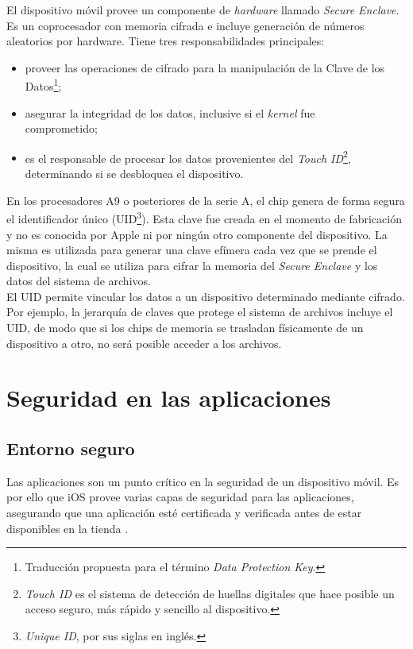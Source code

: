 El dispositivo móvil provee un componente de \textit{hardware} llamado \textit{Secure Enclave}. Es un coprocesador con memoria cifrada e incluye generación de números aleatorios por hardware. Tiene tres responsabilidades principales:
\begin{itemize}
    \item proveer las operaciones de cifrado para la manipulación de la Clave de los Datos\footnote{Traducción propuesta para el término \textit{Data Protection Key}.};
    \item asegurar la integridad de los datos, inclusive si el \textit{kernel} fue \\comprometido;
    \item es el responsable de procesar los datos provenientes del \textit{Touch ID}\footnote{\textit{Touch ID} es el sistema de detección de huellas digitales que hace posible un acceso seguro, más rápido y sencillo al dispositivo.}, determinando si se desbloquea el dispositivo.
\end{itemize}
En los procesadores A9 o posteriores de la serie A, el chip genera de forma segura el identificador único (UID\footnote{\textit{Unique ID}, por sus siglas en inglés.}). Esta clave fue creada en el momento de fabricación y no es conocida por Apple ni por ningún otro componente del dispositivo. La misma es utilizada para generar una clave efímera cada vez que se prende el dispositivo, la cual se utiliza para cifrar la memoria del \textit{Secure Enclave} y los datos del sistema de archivos.\\

El UID permite vincular los datos a un dispositivo determinado mediante cifrado. Por ejemplo, la jerarquía de claves que protege el sistema de archivos incluye el UID, de modo que si los chips de memoria se trasladan físicamente de un dispositivo a otro, no será posible acceder a los archivos.
\section{Seguridad en las aplicaciones}
\subsection{Entorno seguro}
Las aplicaciones son un punto crítico en la seguridad de un dispositivo móvil. Es por ello que iOS provee varias capas de seguridad para las aplicaciones, asegurando que una aplicación esté certificada y verificada antes de estar disponibles en la tienda \cite{asg}.\\

